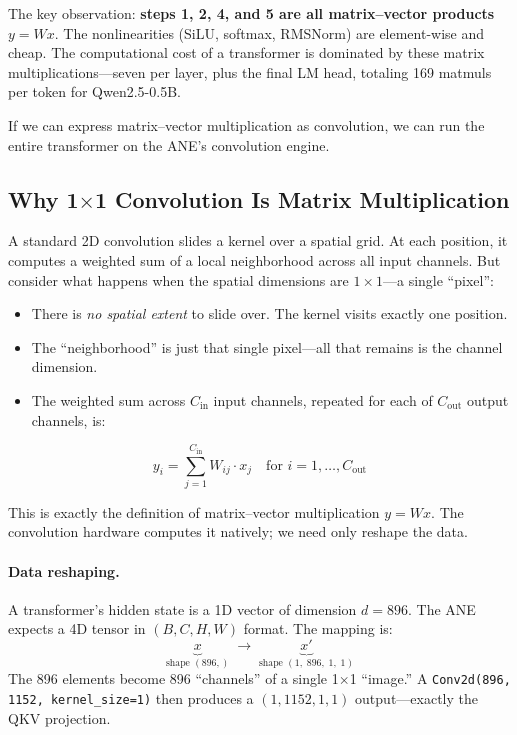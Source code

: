 \documentclass[11pt,twocolumn]{article}
\begin{document}
The key observation: \textbf{steps 1, 2, 4, and 5 are all
matrix--vector products} $y = Wx$.  The nonlinearities (SiLU, softmax,
RMSNorm) are element-wise and cheap.  The computational cost of a
transformer is dominated by these matrix multiplications---seven per
layer, plus the final LM head, totaling 169 matmuls per token for
Qwen2.5-0.5B.

If we can express matrix--vector multiplication as convolution, we can
run the entire transformer on the ANE's convolution engine.

\subsection{Why 1$\times$1 Convolution Is Matrix Multiplication}

A standard 2D convolution slides a kernel over a spatial grid.  At
each position, it computes a weighted sum of a local neighborhood
across all input channels.  But consider what happens when the
spatial dimensions are $1 \times 1$---a single ``pixel'':

\begin{itemize}
\item There is \emph{no spatial extent} to slide over.  The kernel
  visits exactly one position.
\item The ``neighborhood'' is just that single pixel---all that
  remains is the channel dimension.
\item The weighted sum across $C_\text{in}$ input channels, repeated
  for each of $C_\text{out}$ output channels, is:
\end{itemize}

\begin{equation}
y_i = \sum_{j=1}^{C_\text{in}} W_{ij} \cdot x_j
\quad \text{for } i = 1, \ldots, C_\text{out}
\end{equation}

This is exactly the definition of matrix--vector multiplication
$y = Wx$.  The convolution hardware computes it natively; we need
only reshape the data.

\paragraph{Data reshaping.}
A transformer's hidden state is a 1D vector of dimension $d = 896$.
The ANE expects a 4D tensor in $(B, C, H, W)$ format.  The mapping is:
\[
  \underbrace{x}_{\text{shape } (896,)}
  \;\longrightarrow\;
  \underbrace{x'}_{\text{shape } (1,\; 896,\; 1,\; 1)}
\]
The 896 elements become 896 ``channels'' of a single 1$\times$1
``image.''  A \texttt{Conv2d(896, 1152, kernel\_size=1)} then
produces a $(1, 1152, 1, 1)$ output---exactly the QKV projection.
\end{document}
